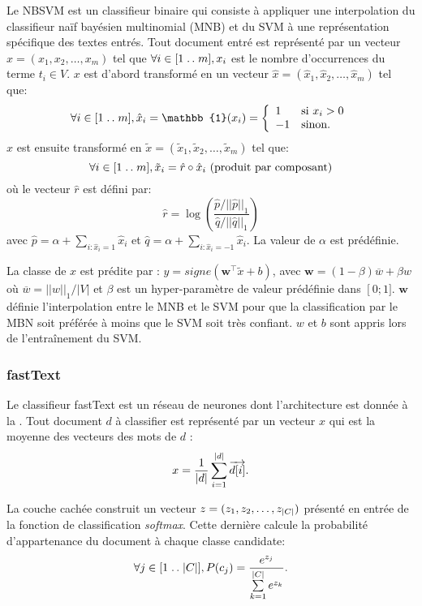Le NBSVM \citep{wang2012nbsvm} est un classifieur binaire qui consiste à appliquer une interpolation du classifieur naïf bayésien multinomial (MNB) et du SVM à une représentation spécifique des textes entrés. Tout document entré est représenté par un vecteur $x=(x_1, x_2, \dots, x_m)$ tel que $\forall i \in [1 \mathrel{{.}\,{.}}\nobreak m], x_i$ est le nombre d'occurrences du terme $t_i \in V$.  $x$ est d'abord transformé en un vecteur $\hat{x}=(\hat{x}_1, \hat{x}_2, \dots, \hat{x}_m)$ tel que: 
\[\forall i \in [1 \twodots m], \hat{x}_i = \mathbb{1}(x_i) = \left\lbrace \begin{array}{ll}
1 & \text{si } x_i > 0 \\
-1 & \text{sinon.}
\end{array} \right.\]  $\hat{x}$ est ensuite transformé en  $\tilde{x}=(\tilde{x}_1, \tilde{x}_2, \dots, \tilde{x}_m)$ tel que: 
\[\forall i \in [1 \mathrel{{.}\,{.}}\nobreak m], \tilde{x}_i = \hat{r} \circ \hat{x}_i\text{  (produit par composant)} \]
où le vecteur $\hat{r}$ est défini par: \[\hat{r}=\log \left(\frac{\hat{p}/\vert\vert \hat{p} \vert\vert_1}{\hat{q} / \vert\vert \hat{q} \vert\vert_1}\right)\] avec $\hat{p}=\alpha + \sum\limits_{i:\hat{x}_i=1}\hat{x}_i$ et $\hat{q}=\alpha + \sum\limits_{i:\hat{x}_i=-1}\hat{x}_i$. La valeur de $\alpha$ est prédéfinie.

 La classe de $x$ est prédite par : $y = signe(\mathbf{w}^\top\tilde{x} + b)$, avec $\mathbf{w} = (1 - \beta) \overline{w} + \beta w$ où $\overline{w} = \vert\vert w\vert\vert_1 / \vert V \vert$ et $\beta$ est un hyper-paramètre de valeur prédéfinie dans $\left[0; 1] \right.$. $\mathbf{w}$ définie l'interpolation entre le MNB et le SVM pour que la classification par le MBN soit préférée à moins que le SVM soit très confiant. $w$ et $b$ sont appris lors de l'entraînement du SVM.
 

\subsubsection{fastText}
 Le classifieur fastText \citep{grave2017fasttextcls} est un réseau de neurones dont l'architecture est donnée à la  \citep{zolotov2017analysisOffastText}. Tout document $d$ à classifier est représenté par un vecteur $x$ qui est la moyenne des vecteurs des mots de $d$ \citep{zolotov2017analysisOffastText}: \[x = \frac{1}{{\vert d\vert}} \sum\limits_{i = 1}^{{\vert d\vert}} \overrightarrow{d[i]}.\]
 
 
 La couche cachée construit un vecteur $z = (z_1, z_2, \dots, z_{\vert C\vert})$ présenté en entrée de la fonction de classification \textit{softmax}. Cette dernière calcule la probabilité d'appartenance du document à chaque classe candidate:
 \[\forall j\in [1\mathrel{{.}\,{.}}\nobreak{\vert C\vert}], P(c_j) = \frac{e^{z_j}}{\sum\limits_{k=1}^{\vert C\vert} e^{z_k}}.\]
 
